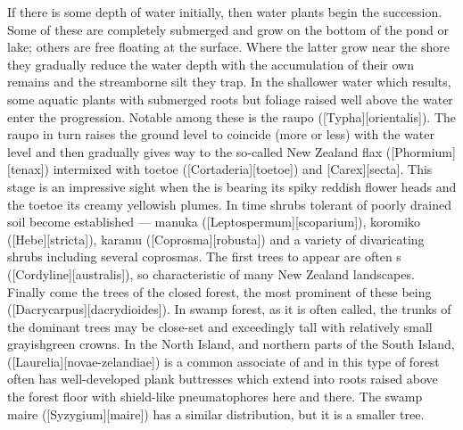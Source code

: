 If there is some depth of water initially, then water plants begin the succession.
Some of these are completely submerged and grow on the bottom of the pond or lake; others are free floating at the surface.
Where the latter grow near the shore they gradually reduce the water depth with the accumulation of their own remains and the streamborne silt they trap.
In the shallower water which results, some aquatic plants with submerged roots but foliage raised well above the water enter the progression.
Notable among these is the raupo ([Typha][orientalis]).
The raupo in turn raises the ground level to coincide (more or less) with the water level and then gradually gives way to the so-called New Zealand flax ([Phormium][tenax]) intermixed with toetoe ([Cortaderia][toetoe]) and [Carex][secta].
This stage is an impressive sight when the  is bearing its spiky reddish flower heads and the toetoe its creamy yellowish plumes.
In time shrubs tolerant of poorly drained soil become established --- manuka ([Leptospermum][scoparium]), koromiko ([Hebe][stricta]), karamu ([Coprosma][robusta]) and a variety of divaricating shrubs including several coprosmas.
The first trees to appear are often s ([Cordyline][australis]), so characteristic of many New Zealand landscapes.
Finally come the trees of the closed forest, the most prominent of these being  ([Dacrycarpus][dacrydioides]).
In  swamp forest, as it is often called, the trunks of the dominant trees may be close-set and exceedingly tall with relatively small grayishgreen crowns.
In the North Island, and northern parts of the South Island,  ([Laurelia][novae-zelandiae]) is a common associate of  and in this type of forest often has well-developed plank buttresses which extend into roots raised above the forest floor with shield-like pneumatophores here and there.
The swamp maire ([Syzygium][maire]) has a similar distribution, but it is a smaller tree.

